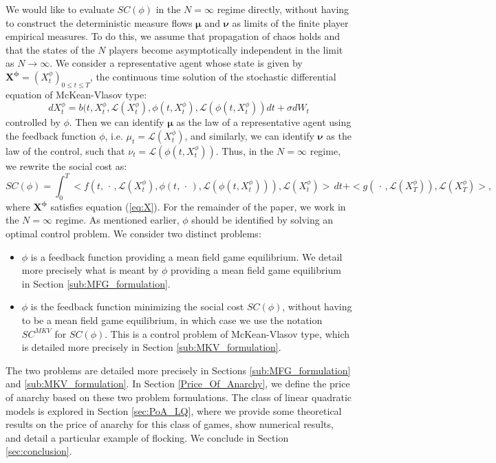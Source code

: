 \documentclass[11pt]{article}
\def\bmu{\boldsymbol{\mu}}
\def\bnu{\boldsymbol{\nu}}
\newcommand\cL{\mathcal L}
\begin{document}
We would like to evaluate $SC(\phi)$ in the $N=\infty$ regime directly, without having to construct the deterministic measure flows $\bmu$ and $\bnu$ as limits of the finite player empirical measures. To do this, we assume that propagation of chaos holds and that the states of the $N$ players become asymptotically independent in the limit as $N \rightarrow \infty$. We consider a representative agent whose state is given by $\boldsymbol{X^{\phi}}=(X^{\phi}_t)_{0 \leq t \leq T}$, the continuous time solution of the stochastic differential equation of McKean-Vlasov type:
\begin{equation}
    dX^{\phi}_t=b(t,X^{\phi}_t,\cL(X^{\phi}_t),\phi(t,X^{\phi}_t),\cL(\phi(t,X^{\phi}_t))dt+\sigma dW_t
\label{eq:X}
\end{equation}
controlled by $\phi$. Then we can identify $\bmu$ as the law of a representative agent using the feedback function $\phi$, i.e. $\mu_t=\cL(X^{\phi}_t)$, and similarly, we can identify $\bnu$ as the law of the control, such that $\nu_t=\cL(\phi(t,X^{\phi}_t))$. Thus, in the $N=\infty$ regime, we rewrite the social cost as:
\begin{equation*}
SC(\phi)=\int_0^T<f(t,\,\cdot\,,\cL(X^{\phi}_t),\phi(t,\,\cdot\,),\cL(\phi(t,X^{\phi}_t))),\cL(X^{\phi}_t)>\,dt+<g(\,\cdot\,,\cL(X^{\phi}_T)),\cL(X^{\phi}_T)>,
\end{equation*}
where $\boldsymbol{X^{\phi}}$ satisfies equation (\ref{eq:X}). For the remainder of the paper, we work in the $N=\infty$ regime. As mentioned earlier, $\phi$ should be identified by solving an optimal control problem. We consider two distinct problems:
\begin{itemize}\itemsep=-2pt
\item $\phi$ is a feedback function providing a mean field game equilibrium. We detail more precisely what is meant by $\phi$ providing a mean field game equilibrium in Section \ref{sub:MFG_formulation}.
\item $\phi$ is the feedback function minimizing the social cost $SC(\phi)$, without having to be a mean field game equilibrium, in which case we use the notation $SC^{MKV}$ for $SC(\phi)$. This is a control problem of McKean-Vlasov type, which is detailed more precisely in Section \ref{sub:MKV_formulation}.
\end{itemize}
The two problems are detailed more precisely in Sections \ref{sub:MFG_formulation} and \ref{sub:MKV_formulation}. In Section \ref{Price_Of_Anarchy}, we define the price of anarchy based on these two problem formulations. The class of linear quadratic models is explored in Section \ref{sec:PoA_LQ}, where we provide some theoretical results on the price of anarchy for this class of games, show numerical results, and detail a particular example of flocking. We conclude in Section \ref{sec:conclusion}.
\end{document}
